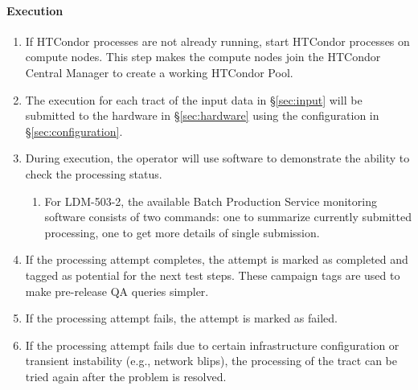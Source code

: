 \paragraph{Execution}
\begin{enumerate}
  \item{If HTCondor processes are not already running, start HTCondor processes on compute nodes.  This step makes the compute nodes join the HTCondor Central Manager to create a working HTCondor Pool.}
  \item{The execution for each tract of the input data in \S\ref{sec:input} will be submitted to the hardware in \S\ref{sec:hardware} using the configuration in \S\ref{sec:configuration}.}
  \item{During execution, the operator will use software to demonstrate the ability to check the processing status.}
  \begin{enumerate}
    \item{For LDM-503-2, the available Batch Production Service monitoring software consists of two commands: one to summarize currently submitted processing, one to get more details of single submission.}
  \end{enumerate}
  \item{If the processing attempt completes, the attempt is marked as completed and tagged as potential for the next test steps.  These campaign tags are used to make pre-release QA queries simpler.}
  \item{If the processing attempt fails, the attempt is marked as failed.}
  \item{If the processing attempt fails due to certain infrastructure configuration or transient instability (e.g., network blips), the processing of the tract can be tried again after the problem is resolved.}
\end{enumerate}

